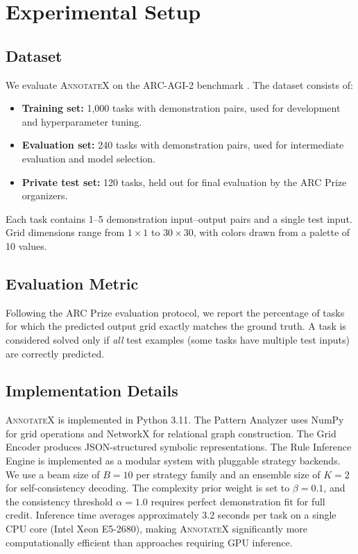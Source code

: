 \documentclass[conference,10pt,letterpaper]{IEEEtran}
\newcommand{\annotatexname}{\textsc{AnnotateX}}
\begin{document}
\section{Experimental Setup}
\label{sec:experimental_setup}

\subsection{Dataset}

We evaluate \annotatexname{} on the ARC-AGI-2 benchmark \cite{arcprize2024}. The dataset consists of:
\begin{itemize}[leftmargin=*,nosep]
    \item \textbf{Training set:} 1,000 tasks with demonstration pairs, used for development and hyperparameter tuning.
    \item \textbf{Evaluation set:} 240 tasks with demonstration pairs, used for intermediate evaluation and model selection.
    \item \textbf{Private test set:} 120 tasks, held out for final evaluation by the ARC Prize organizers.
\end{itemize}

Each task contains 1--5 demonstration input--output pairs and a single test input. Grid dimensions range from $1 \times 1$ to $30 \times 30$, with colors drawn from a palette of 10 values.

\subsection{Evaluation Metric}

Following the ARC Prize evaluation protocol, we report the percentage of tasks for which the predicted output grid exactly matches the ground truth. A task is considered solved only if \emph{all} test examples (some tasks have multiple test inputs) are correctly predicted.

\subsection{Implementation Details}

\annotatexname{} is implemented in Python 3.11. The Pattern Analyzer uses NumPy for grid operations and NetworkX for relational graph construction. The Grid Encoder produces JSON-structured symbolic representations. The Rule Inference Engine is implemented as a modular system with pluggable strategy backends. We use a beam size of $B = 10$ per strategy family and an ensemble size of $K = 2$ for self-consistency decoding. The complexity prior weight is set to $\beta = 0.1$, and the consistency threshold $\alpha = 1.0$ requires perfect demonstration fit for full credit. Inference time averages approximately 3.2 seconds per task on a single CPU core (Intel Xeon E5-2680), making \annotatexname{} significantly more computationally efficient than approaches requiring GPU inference.
\end{document}
